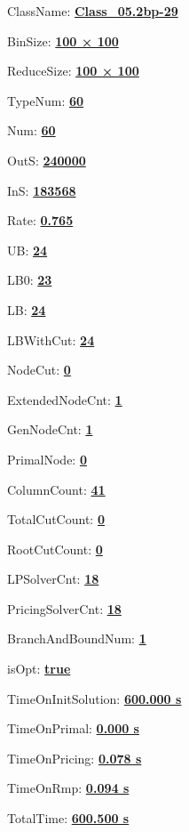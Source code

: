\documentclass[11pt]{article}
\begin{document}
\pagestyle{empty}


ClassName: \underline{\textbf{Class_05.2bp-29}}
\par
BinSize: \underline{\textbf{100 × 100}}
\par
ReduceSize: \underline{\textbf{100 × 100}}
\par
TypeNum: \underline{\textbf{60}}
\par
Num: \underline{\textbf{60}}
\par
OutS: \underline{\textbf{240000}}
\par
InS: \underline{\textbf{183568}}
\par
Rate: \underline{\textbf{0.765}}
\par
UB: \underline{\textbf{24}}
\par
LB0: \underline{\textbf{23}}
\par
LB: \underline{\textbf{24}}
\par
LBWithCut: \underline{\textbf{24}}
\par
NodeCut: \underline{\textbf{0}}
\par
ExtendedNodeCnt: \underline{\textbf{1}}
\par
GenNodeCnt: \underline{\textbf{1}}
\par
PrimalNode: \underline{\textbf{0}}
\par
ColumnCount: \underline{\textbf{41}}
\par
TotalCutCount: \underline{\textbf{0}}
\par
RootCutCount: \underline{\textbf{0}}
\par
LPSolverCnt: \underline{\textbf{18}}
\par
PricingSolverCnt: \underline{\textbf{18}}
\par
BranchAndBoundNum: \underline{\textbf{1}}
\par
isOpt: \underline{\textbf{true}}
\par
TimeOnInitSolution: \underline{\textbf{600.000 s}}
\par
TimeOnPrimal: \underline{\textbf{0.000 s}}
\par
TimeOnPricing: \underline{\textbf{0.078 s}}
\par
TimeOnRmp: \underline{\textbf{0.094 s}}
\par
TotalTime: \underline{\textbf{600.500 s}}
\par
\newpage


\end{document}
